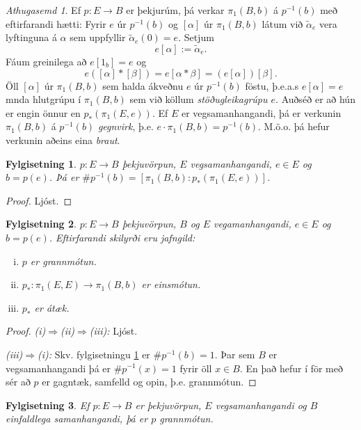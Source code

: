 \documentclass[a4paper,icelandic]{book}
\theoremstyle{definition}
\theoremstyle{plain}
\newtheorem{fylgisetn}{Fylgisetning}[section]
\theoremstyle{remark}
\newtheorem*{ath}{Athugasemd}
\begin{document}
\begin{ath}
  Ef $p:E\to B$ er þekjurúm, þá verkar $\pi_1(B,b)$ á $p^{-1}(b)$ með
  eftirfarandi hætti: Fyrir $e$ úr $p^{-1}(b)$ og $[\alpha]$ úr
  $\pi_1(B,b)$ látum við $\tilde\alpha_e$ vera lyftinguna á $\alpha$ sem
  uppfyllir $\tilde\alpha_e(0)=e$. Setjum 
  \[  e[\alpha]:=\tilde\alpha_e. \]
  Fáum greinilega að $e[1_b] = e$ og \[
  e([\alpha]*[\beta])
  = e[\alpha*\beta]
  = (e[\alpha])[\beta].
  \]
  Öll $[\alpha]$ úr $\pi_1(B,b)$ sem halda ákveðnu $e$ úr $p^{-1}(b)$
  föstu, þ.e.a.s $e[\alpha]=e$ mnda hlutgrúpu í $\pi_1(B,b)$ sem við
  köllum \emph{stöðugleikagrúpu
  $e$}. Auðséð er að hún er engin
  önnur en $p_*(\pi_1(E,e))$. Ef $E$ er vegsamanhangandi, þá er verkunin
  $\pi_1(B,b)$ á $p^{-1}(b)$ \emph{gegnvirk}, þ.e.
  $e\cdot\pi_1(B,b)=p^{-1}(b)$. M.ö.o. þá hefur verkunin aðeins eina
  \emph{braut}.
\end{ath}
\begin{fylgisetn}\label{fylgisetn:thekju.1}
  $p:E\to B$ þekjuvörpun, $E$ vegsamanhangandi, $e\in E$ og $b=p(e)$. Þá
  er $\#p^{-1}(b)=[\pi_1(B,b):p_*(\pi_1(E,e))]$.
\end{fylgisetn}
\begin{proof}
  Ljóst.
\end{proof}
\begin{fylgisetn}\label{fylgisetn:thekju.2}
  $p:E\to B$ þekjuvörpun, $B$ og $E$ vegamanhangandi, $e\in E$ og
  $b=p(e)$. Eftirfarandi skilyrði eru jafngild:
  \begin{enumerate}[(i)]
    \item $p$ er grannmótun.
    \item $p_*:\pi_1(E,E)\to\pi_1(B,b)$ er einsmótun.
    \item $p_*$ er átæk. 
  \end{enumerate}
\end{fylgisetn}
\begin{proof}
  \emph{(i)$\Rightarrow$(ii)$\Rightarrow$(iii):} Ljóst.

  \emph{(iii)$\Rightarrow$(i):} Skv. fylgisetningu
  \ref{fylgisetn:thekju.1} er $\#p^{-1}(b)=1$. Þar sem $B$ er
  vegsamanhangandi þá er $\#p^{-1}(x)=1$ fyrir öll $x\in B$. En það
  hefur í för með sér að $p$ er gagntæk, samfelld og opin, þ.e.
  grannmótun.
\end{proof}
\begin{fylgisetn}\label{fylgisetn:thekju.3}
  Ef $p:E\to B$ er þekjuvörpun, $E$ vegsamanhangandi og $B$ einfaldlega
  samanhangandi, þá er $p$ grannmótun. 
\end{fylgisetn}
\end{document}
